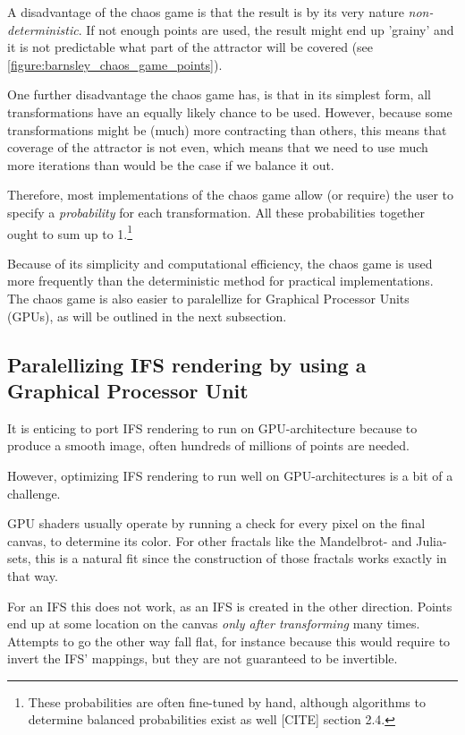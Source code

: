 \documentclass[11pt]{article}
\newcommand*{\altasterism}{\vspace*{1em plus .5em minus .5em}\noindent\hspace*{\fill}\ding{104}\hspace*{\fill}}
\begin{document}
A disadvantage of the chaos game is that the result is by its very nature \emph{non-deterministic}.
If not enough points are used, the result might end up 'grainy' and it is not predictable what part of the attractor will be covered (see \autoref{figure:barnsley_chaos_game_points}).


One further disadvantage the chaos game has, is that in its simplest form, all transformations have an equally likely chance to be used.
However, because some transformations might be (much) more contracting than others, this means that coverage of the attractor is not even,
which means that we need to use much more iterations than would be the case if we balance it out.

Therefore, most implementations of the chaos game allow (or require) the user to specify a \emph{probability} for each transformation.
All these probabilities together ought to sum up to 1.\footnote{These probabilities are often fine-tuned by hand, although algorithms to determine balanced probabilities exist as well [CITE] section 2.4.}

\altasterism

Because of its simplicity and computational efficiency, the chaos game is used more frequently than the deterministic method for practical implementations.
The chaos game is also easier to paralellize for Graphical Processor Units (GPUs), as will be outlined in the next subsection.

\subsection{Paralellizing IFS rendering by using a Graphical Processor Unit}
\label{sec:org77a71e4}

It is enticing to port IFS rendering to run on GPU-architecture because to produce a smooth image, often hundreds of millions of points are needed.

However, optimizing IFS rendering to run well on GPU-architectures is a bit of a challenge.

GPU shaders usually operate by running a check for every pixel on the final canvas, to determine its color.
For other fractals like the Mandelbrot- and Julia-sets, this is a natural fit since the construction of those fractals works exactly in that way.

For an IFS this does not work, as an IFS is created in the other direction. Points end up at some location on the canvas \emph{only after transforming} many times.
Attempts to go the other way fall flat, for instance because this would require to invert the IFS' mappings, but they are not guaranteed to be invertible.
\end{document}

